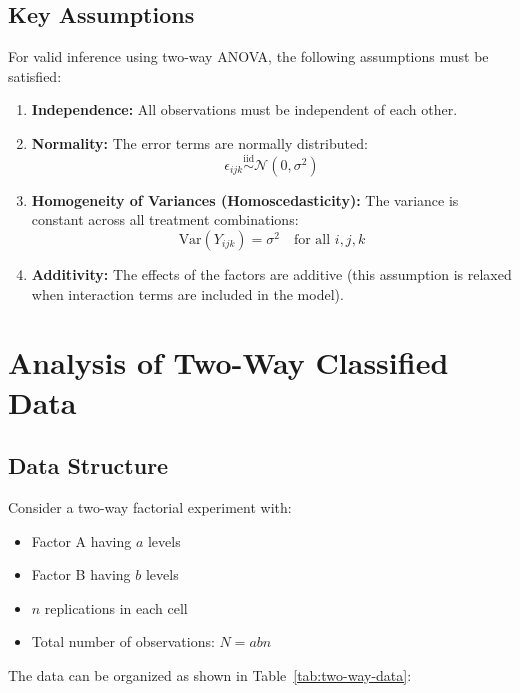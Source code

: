 \documentclass[twoside]{book}
\begin{document}
\subsection{Key Assumptions}

For valid inference using two-way ANOVA, the following assumptions must be satisfied:

\begin{enumerate}
\item \textbf{Independence:} All observations must be independent of each other.

\item \textbf{Normality:} The error terms are normally distributed:
\[
\epsilon_{ijk} \overset{\text{iid}}{\sim} \mathcal{N}(0, \sigma^2)
\]

\item \textbf{Homogeneity of Variances (Homoscedasticity):} The variance is constant across all treatment combinations:
\[
\text{Var}(Y_{ijk}) = \sigma^2 \quad \text{for all } i, j, k
\]

\item \textbf{Additivity:} The effects of the factors are additive (this assumption is relaxed when interaction terms are included in the model).
\end{enumerate}

\section{Analysis of Two-Way Classified Data}

\subsection{Data Structure}

Consider a two-way factorial experiment with:
\begin{itemize}
\item Factor A having $a$ levels
\item Factor B having $b$ levels
\item $n$ replications in each cell
\item Total number of observations: $N = abn$
\end{itemize}

The data can be organized as shown in Table~\ref{tab:two-way-data}:
\end{document}
